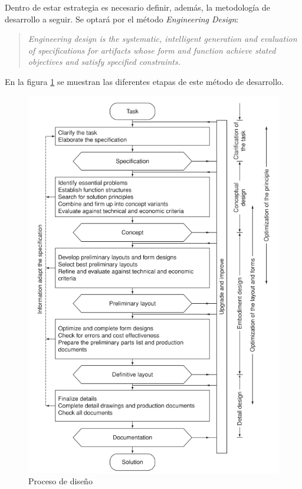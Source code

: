 Dentro de estar estrategia es necesario definir, además, la metodología de
desarrollo a seguir. Se optará por el método \textit{Engineering Design}:
    
\begin{quote}\textit{
  Engineering design is the systematic, intelligent generation and evaluation of
  specifications for artifacts whose form and function achieve stated objectives
  and satisfy specified constraints.}\cite{Dym2012}
\end{quote}

En la figura \ref{fig:engineering_design} se muestran las diferentes etapas
de este método de desarrollo.
 
\begin{figure}
  \centering
  \includegraphics[width=\linewidth]{images/2_methodology/design_process.png}
  \caption{Proceso de diseño\cite{Dym2012,Pahl1984}}
  \label{fig:engineering_design}
\end{figure}
    
